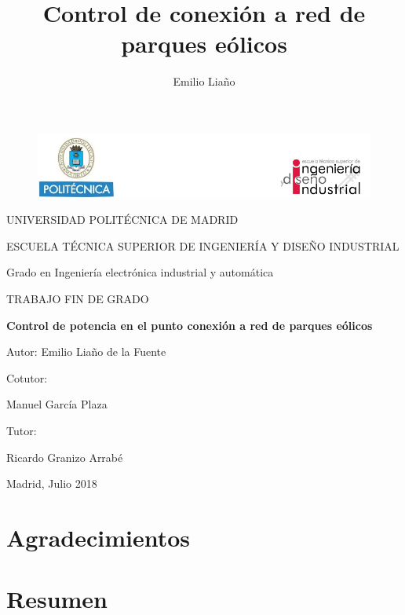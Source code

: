 \documentclass{book}
\title{Control de conexi\'on a red de parques e\'olicos}
\date{}
\author{Emilio Lia\~no}
\begin{document}
\begin{figure}[h!]
\centering
\includegraphics[width=\textwidth]{Encabezado.PNG}
\end{figure}
\begin{center}
	\LARGE
	UNIVERSIDAD POLIT\'ECNICA DE MADRID \par
	\vspace {10 mm}
	ESCUELA T\'ECNICA SUPERIOR DE INGENIER\'IA Y DISEÑO INDUSTRIAL\par
	\vspace {10 mm}
	\LARGE
	Grado en Ingenier\'ia electr\'onica industrial y autom\'atica \par
	\vspace {10 mm}
	\Huge
	TRABAJO FIN DE GRADO \par
	\vspace{20 mm}
	\LARGE
	\textbf{Control de potencia en el punto conexi\'on a red de parques e\'olicos}\par
	\vspace {10 mm}
	Autor: Emilio Liaño de la Fuente \par
	\vspace {10 mm}
\end{center}
\begin{multicols}{2}
	\LARGE
	Cotutor:

	Manuel Garc\'ia Plaza \par
	Tutor:

	Ricardo Granizo Arrab\'e
\vfill
		
\end{multicols}

\begin{flushright}
\vfill
	Madrid, Julio 2018
\end{flushright}
\afterpage{\null\newpage}
\newpage
\normalsize
{}

\chapter*{Agradecimientos}

\chapter*{Resumen}
\end{document}
